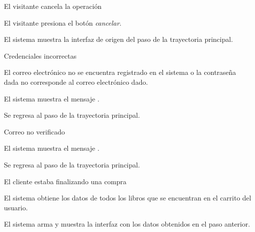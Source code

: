 {  \begin{trayectoriaAlternativa}[ta:cancelar]
    {El visitante cancela la operación}

    \item El visitante presiona el botón \textit{cancelar}.

    \item El sistema muestra la interfaz de origen del paso
       de la trayectoria principal.

  \end{trayectoriaAlternativa}


  \begin{trayectoriaAlternativa}
    {Credenciales incorrectas}

    \item El correo electrónico no se encuentra registrado en el sistema o la
      contraseña dada no corresponde al correo electrónico dado.

    \item El sistema muestra el mensaje
      .

    \item Se regresa al paso  de la trayectoria
      principal.

  \end{trayectoriaAlternativa}


  \begin{trayectoriaAlternativa}
    {Correo no verificado}

    \item El sistema muestra el mensaje
      .

    \item Se regresa al paso  de la trayectoria
      principal.

  \end{trayectoriaAlternativa}


  \begin{trayectoriaAlternativa}
    {El cliente estaba finalizando una compra}

    \item El sistema obtiene los datos de todos los libros que se encuentran en
      el carrito del usuario.

    \item El sistema arma y muestra la interfaz
       con los datos obtenidos en el paso
      anterior.

  \end{trayectoriaAlternativa}
}

